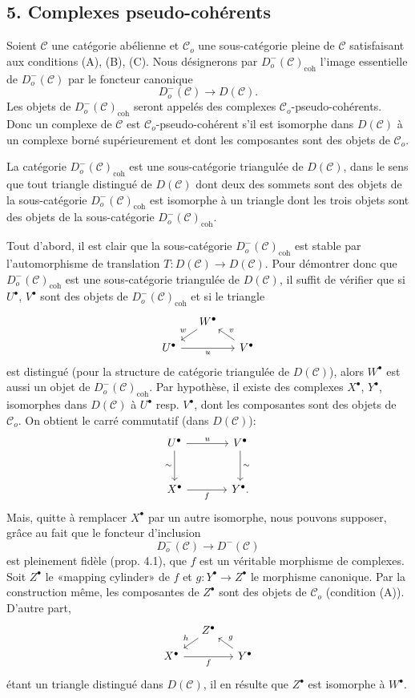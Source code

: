 \documentclass[11pt]{article}
\providecommand{\coh}{\mathrm{coh}}
\providecommand{\cC}{\mathcal C}
\providecommand{\cC}{\mathcal C}
\providecommand{\coh}{\mathrm{coh}}
\begin{document}
\subsection*{5. Complexes pseudo-cohérents}

Soient $\cC$ une catégorie abélienne et $\cC_o$ une sous-catégorie pleine de $\cC$ satisfaisant aux conditions (A), (B), (C). Nous désignerons par $D_o^-(\cC)_{\coh}$ l'image essentielle de $D_o^-(\cC)$ par le foncteur canonique
\[
D_o^-(\cC)\longrightarrow D(\cC).
\]
Les objets de $D_o^-(\cC)_{\coh}$ seront appelés des complexes $\cC_o$-pseudo-cohérents. Donc un complexe de $\cC$ est $\cC_o$-pseudo-cohérent s'il est isomorphe dans $D(\cC)$ à un complexe borné supérieurement et dont les composantes sont des objets de $\cC_o$.

La catégorie $D_o^-(\cC)_{\coh}$ est une sous-catégorie triangulée de $D(\cC)$, dans le sens que tout triangle distingué de $D(\cC)$ dont deux des sommets sont des objets de la sous-catégorie $D_o^-(\cC)_{\coh}$ est isomorphe à un triangle dont les trois objets sont des objets de la sous-catégorie $D_o^-(\cC)_{\coh}$.

Tout d'abord, il est clair que la sous-catégorie $D_o^-(\cC)_{\coh}$ est stable par l'automorphisme de translation $T:D(\cC)\to D(\cC)$. Pour démontrer donc que $D_o^-(\cC)_{\coh}$ est une sous-catégorie triangulée de $D(\cC)$, il suffit de vérifier que si $U^\bullet$, $V^\bullet$ sont des objets de $D_o^-(\cC)_{\coh}$ et si le triangle
\[
\begin{tikzcd}[column sep=small,row sep=small]
& W^\bullet \arrow[dl,"w"']\\
U^\bullet \arrow[rr,"u"']&& V^\bullet \arrow[ul,"v"']
\end{tikzcd}
\]
est distingué (pour la structure de catégorie triangulée de $D(\cC)$), alors $W^\bullet$ est aussi un objet de $D_o^-(\cC)_{\coh}$. Par hypothèse, il existe des complexes $X^\bullet$, $Y^\bullet$, isomorphes dans $D(\cC)$ à $U^\bullet$ resp. $V^\bullet$, dont les composantes sont des objets de $\cC_o$. On obtient le carré commutatif (dans $D(\cC)$):
\[
\begin{tikzcd}[column sep=large,row sep=large]
U^\bullet \arrow[r,"u"] \arrow[d,"\sim"']&V^\bullet \arrow[d,"\sim"]\\
X^\bullet \arrow[r,"f"']&Y^\bullet .
\end{tikzcd}
\]
Mais, quitte à remplacer $X^\bullet$ par un autre isomorphe, nous pouvons supposer, grâce au fait que le foncteur d'inclusion
\[
D_o^-(\cC)\longrightarrow D^-(\cC)
\]
est pleinement fidèle (prop. 4.1), que $f$ est un véritable morphisme de complexes. Soit $Z^\bullet$ le «mapping cylinder» de $f$ et $g:Y^\bullet\to Z^\bullet$ le morphisme canonique. Par la construction même, les composantes de $Z^\bullet$ sont des objets de $\cC_o$ (condition (A)). D'autre part,
\[
\begin{tikzcd}[column sep=small,row sep=small]
&Z^\bullet \arrow[dl,"h"']\\
X^\bullet \arrow[rr,"f"']&&Y^\bullet \arrow[ul,"g"']
\end{tikzcd}
\]
étant un triangle distingué dans $D(\cC)$, il en résulte que $Z^\bullet$ est isomorphe à $W^\bullet$.
\end{document}
